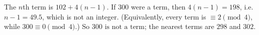 The $n$th term is $102+4(n-1)$. If $300$ were a term, then $4(n-1)=198$, i.e.\ $n-1=49.5$, which is not an integer. (Equivalently, every term is $\equiv2\pmod4$, while $300\equiv0\pmod4$.) So $\boxed{300\text{ is not a term}}$; the nearest terms are $298$ and $302$.
